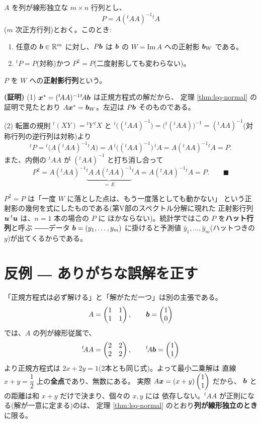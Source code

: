 \begin{teiri}[正射影行列]\label{thm:lsq-projmat}
$A$ を列が線形独立な $m \times n$ 行列とし、
\[
P = A({}^t\!AA)^{-1}{}^t\!A
\]
($m$ 次正方行列)とおく。このとき:
\begin{enumerate}
\item 任意の $\bm{b} \in \mathbb{R}^m$ に対し、$P\bm{b}$ は $\bm{b}$ の
$W = \mathrm{Im}\,A$ への正射影 $\bm{b}_W$ である。
\item ${}^t\!P = P$(対称)かつ $P^2 = P$(二度射影しても変わらない)。
\end{enumerate}
$P$ を $W$ への\textbf{正射影行列}という。
\end{teiri}

\noindent\textbf{(証明)}\quad
(1) $\bm{x}^* = ({}^t\!AA)^{-1}{}^t\!A\bm{b}$ は正規方程式の解だから、
定理 \ref{thm:lsq-normal} の証明で見たとおり
$A\bm{x}^* = \bm{b}_W$。左辺は $P\bm{b}$ そのものである。

(2) 転置の規則 ${}^t\!(XY) = {}^t Y\,{}^t\!X$ と
${}^t\!\bigl(({}^t\!AA)^{-1}\bigr) = \bigl({}^t\!({}^t\!AA)\bigr)^{-1}
= ({}^t\!AA)^{-1}$(対称行列の逆行列は対称)より
\[
{}^t\!P = {}^t\!\bigl(A({}^t\!AA)^{-1}{}^t\!A\bigr)
= A\,{}^t\!\bigl(({}^t\!AA)^{-1}\bigr)\,{}^t\!A = A({}^t\!AA)^{-1}{}^t\!A = P.
\]
また、内側の ${}^t\!A A$ が $({}^t\!AA)^{-1}$ と打ち消し合って
\[
P^2 = A({}^t\!AA)^{-1}\underbrace{{}^t\!A\,A({}^t\!AA)^{-1}}_{=\,E}{}^t\!A
= A({}^t\!AA)^{-1}{}^t\!A = P. \qquad\blacksquare
\]

$P^2 = P$ は「一度 $W$ に落とした点は、もう一度落としても動かない」
という正射影の幾何を式にしたものである(第V部のスペクトル分解に現れた
正射影行列 $\bm{u}\,{}^t\bm{u}$ は、$n = 1$ 本の場合の $P$ に
ほかならない)。統計学ではこの $P$ を\textbf{ハット行列}と呼ぶ
――データ $\bm{b} = (y_1, \dots, y_m)$ に掛けると予測値
$\hat{y}_1, \dots, \hat{y}_m$(ハットつきの $y$)が出てくるからである。

\section{反例 ― ありがちな誤解を正す}

\begin{hanrei}[列が線形従属なら最小二乗解は一つに定まらない]\label{hanrei:lsq-dependent}
「正規方程式は必ず解ける」と「解がただ一つ」は別の主張である。
\[
A = \begin{pmatrix}1 & 1 \\ 1 & 1\end{pmatrix}, \qquad \bm{b} = \begin{pmatrix}1 \\ 0\end{pmatrix}
\]
では、$A$ の列が線形従属で、
\[
{}^t\!AA = \begin{pmatrix}2 & 2 \\ 2 & 2\end{pmatrix}, \qquad {}^t\!A\bm{b} = \begin{pmatrix}1 \\ 1\end{pmatrix}
\]
より正規方程式は $2x + 2y = 1$(2本とも同じ式)。よって最小二乗解は
直線 $x + y = \dfrac{1}{2}$ 上の\textbf{全点}であり、無数にある。
実際 $A\bm{x} = (x + y)\begin{pmatrix}1 \\ 1\end{pmatrix}$ だから、
$\bm{b}$ との距離は和 $x + y$ だけで決まり、個々の $x, y$ には
依存しない。${}^t\!AA$ が正則になる(解が一意に定まる)のは、
定理 \ref{thm:lsq-normal} のとおり\textbf{列が線形独立のとき}に限る。
\end{hanrei}

